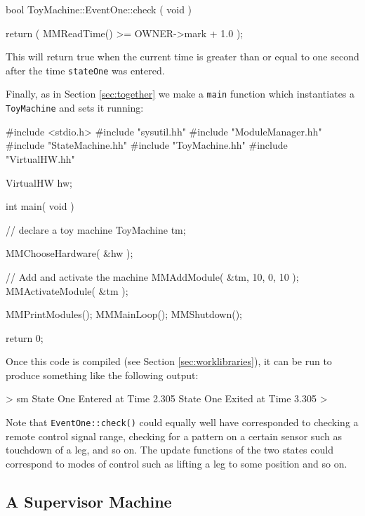 \begin{codesegment}
  bool ToyMachine::EventOne::check ( void ) { 

    return ( MMReadTime() >= OWNER->mark + 1.0 );

  }
\end{codesegment}

\noindent This will return true when the current time is greater than or equal to one second after
the time {\tt stateOne} was entered.

Finally, as in Section \ref{sec:together} we make a {\tt main}
function which instantiates a {\tt ToyMachine} and sets it running:

\begin{codesegment}
  #include <stdio.h>
  #include "sysutil.hh"
  #include "ModuleManager.hh"
  #include "StateMachine.hh"
  #include "ToyMachine.hh"
  #include "VirtualHW.hh"

  VirtualHW hw;

  int main( void ) {

    // declare a toy machine
    ToyMachine tm;

    MMChooseHardware( &hw );

    // Add and activate the machine
    MMAddModule( &tm, 10, 0, 10 );
    MMActivateModule( &tm );

    MMPrintModules();
    MMMainLoop();
    MMShutdown();

    return 0;
  }
\end{codesegment}

\noindent Once this code is compiled (see Section \ref{sec:worklibraries}),
it can be run to produce something like the following output:

\begin{codesegment}
  > sm 
  State One Entered at Time 2.305
  State One Exited at Time 3.305 
  >
\end{codesegment}

\noindent Note that {\tt EventOne::check()} could equally well have
corresponded to checking a remote control signal range, checking for a
pattern on a certain sensor such as touchdown of a leg, and so on. The
update functions of the two states could correspond to modes of control such
as lifting a leg to some position and so on.

\subsection{A Supervisor Machine}

